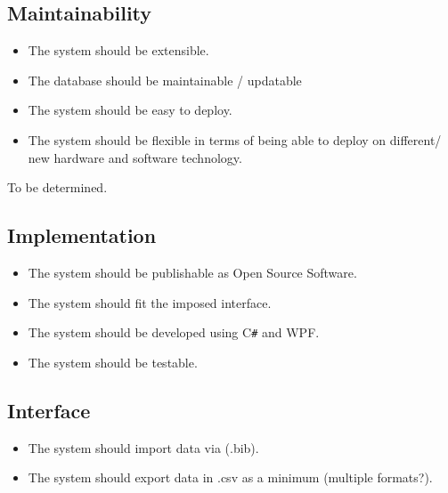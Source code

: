 \subsection{Maintainability}

\begin{itemize}
\item The system should be extensible. 
\item The database should be maintainable / updatable
\item The system should be easy to deploy.
\item The system should be flexible in terms of being able to deploy on different/ new hardware and software technology.
\end{itemize}


%

To be determined.


\subsection{Implementation}
\begin{itemize}
\item The system should be publishable as Open Source Software.
\item The system should fit the imposed interface.
\item The system should be developed using C\texttt{\#} and WPF.
\item The system should be testable.
\end{itemize}

\subsection{Interface}

\begin{itemize}
\item The system should import data via (.bib).
\item The system should export data in .csv as a minimum (multiple formats?).
\end{itemize}


